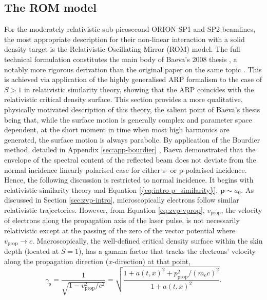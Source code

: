 \subsection{The ROM model}
For the moderately relativistic sub-picosecond ORION SP1 and SP2 beamlines, the most appropriate description for their non-linear interaction with a solid density target is the Relativistic Oscillating Mirror (ROM) model. The full technical formulation constitutes the main body of Baeva's 2008 thesis \cite{baevaHighHarmonicGeneration2008}, a notably more rigorous derivation than the original paper on the same topic \cite{baevaTheoryHighorderHarmonic2006}. This is achieved via application of the highly generalised \ac{ARP} formalism to the case of $S>1$ in relativistic similarity theory, showing that the \ac{ARP} coincides with the relativistic critical density surface. This section provides a more qualitative, physically motivated description of this theory, the salient point of Baeva's thesis being that, while the surface motion is generally complex and parameter space dependent, at the short moment in time when most high harmonics are generated, the surface motion is always parabolic. By application of the Bourdier method, detailed in Appendix \ref{sec:app-bourdier} \cite{bourdierObliqueIncidenceStrong1983}, Baeva demonstrated that the envelope of the spectral content of the reflected beam does not deviate from the normal incidence linearly polarised case for either s- or p-polarised incidence. Hence, the following discussion is restricted to normal incidence. It begins with relativistic similarity theory and Equation \ref{{eq:intro-p_similarity}}, $\mathbf{p} \sim a_0$. As discussed in Section \ref{sec:zvp-intro}, microscopically electrons follow similar relativistic trajectories. However, from Equation \ref{eq:zvp-vprop}, $v_\mathrm{prop}$, the velocity of electrons along the propagation axis of the laser pulse, is not necessarily relativistic except at the passing of the zero of the vector potential where $v_\mathrm{prop} \to c$. Macroscopically, the well-defined critical density surface within the skin depth (located at $S =1$), has a gamma factor that tracks the electrons' velocity along the propagation direction ($x$-direction) at that point,
\begin{equation}\label{eq:orion-gamma_s}
	\gamma_\mathrm{s} = \frac{1}{\sqrt{1-v_\mathrm{prop}^2/c^2}} = \sqrt{ \frac{1 + a(t,x)^2 +  p_\mathrm{prop}^2/(m_\mathrm{e}c)^2}{1 + a(t,x)^2}}.
\end{equation}
